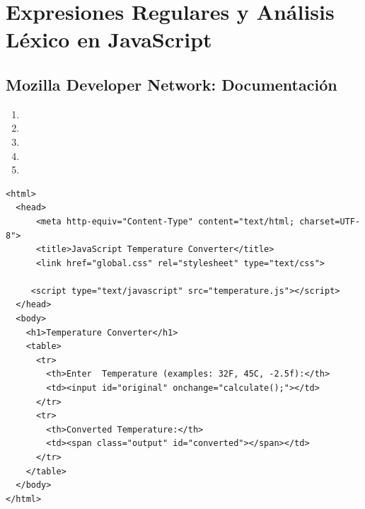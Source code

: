\chapter{Expresiones Regulares y Análisis Léxico en JavaScript}


\section{Mozilla Developer Network: Documentación}

\begin{enumerate}
\item {}
\item 
{}
\item 
{}
\item 
{}
\item 
{}
\end{enumerate}


\begin{verbatim}
<html>
  <head>
      <meta http-equiv="Content-Type" content="text/html; charset=UTF-8">
      <title>JavaScript Temperature Converter</title>
      <link href="global.css" rel="stylesheet" type="text/css">

     <script type="text/javascript" src="temperature.js"></script>
  </head>
  <body>
    <h1>Temperature Converter</h1>
    <table>
      <tr>
        <th>Enter  Temperature (examples: 32F, 45C, -2.5f):</th>
        <td><input id="original" onchange="calculate();"></td>
      </tr>
      <tr>
        <th>Converted Temperature:</th>
        <td><span class="output" id="converted"></span></td>
      </tr>
    </table>
  </body>
</html>
\end{verbatim}

